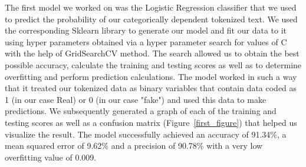 \documentclass[10pt,twocolumn,letterpaper]{article}
\begin{document}
The first model we worked on was the Logistic Regression classifier that we used to predict the probability of our categorically dependent tokenized text. We used the corresponding Sklearn library to generate our model and fit our data to it using hyper parameters obtained via a hyper parameter search for values of C with the help of GridSearchCV method. The search allowed us to obtain the best possible accuracy, calculate the training and testing scores as well as to determine overfitting and perform prediction calculations. The model worked in such a way that it treated our tokenized data as binary variables that contain data coded as 1 (in our case Real) or 0 (in our case "fake") and used this data to make predictions. We subsequently generated a graph of each of the training and testing scores as well as a confusion matrix (Figure~\ref{first_figure}) that helped us visualize the result. The model successfully achieved an accuracy of 91.34\%, a mean squared error of 9.62\% and a precision of 90.78\% with a very low overfitting value of 0.009. \\
\end{document}
